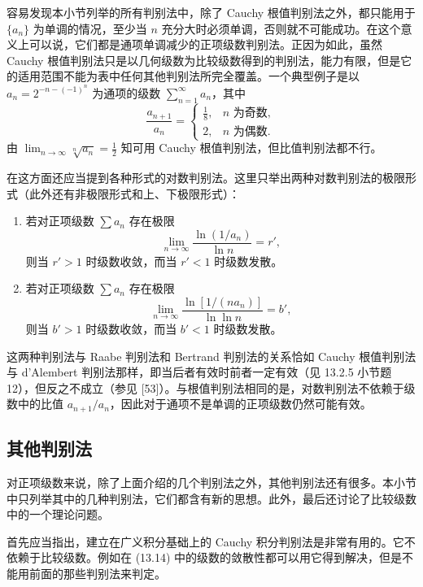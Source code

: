 \begin{xremark}
容易发现本小节列举的所有判别法中，除了 Cauchy 根值判别法之外，都只能用于 $\{a_n\}$ 为单调的情况，至少当 $n$ 充分大时必须单调，否则就不可能成功。在这个意义上可以说，它们都是通项单调减少的正项级数判别法。正因为如此，虽然 Cauchy 根值判别法只是以几何级数为比较级数得到的判别法，能力有限，但是它的适用范围不能为表中任何其他判别法所完全覆盖。一个典型例子是以 $a_n=2^{-n-(-1)^n}$ 为通项的级数 $\sum_{n=1}^{\infty}a_n$，其中
\[
\frac{a_{n+1}}{a_n}=\begin{cases}\frac18,&n\text{ 为奇数},\\2,&n\text{ 为偶数}.
\end{cases}
\]
由 $\lim_{n\to\infty}\sqrt[n]{a_n}=\frac12$ 知可用 Cauchy 根值判别法，但比值判别法都不行。
\end{xremark}

\begin{xremark}
在这方面还应当提到各种形式的对数判别法。这里只举出两种对数判别法的极限形式（此外还有非极限形式和上、下极限形式）：
\begin{enumerate}[label=\arabic*.]
\item 若对正项级数 $\sum a_n$ 存在极限
\begin{equation}
\lim_{n\to\infty}\frac{\ln(1/a_n)}{\ln n}=r',
\tag{13.15}
\end{equation}
则当 $r'>1$ 时级数收敛，而当 $r'<1$ 时级数发散。
\item 若对正项级数 $\sum a_n$ 存在极限
\begin{equation}
\lim_{n\to\infty}\frac{\ln[1/(na_n)]}{\ln\ln n}=b',
\tag{13.16}
\end{equation}
则当 $b'>1$ 时级数收敛，而当 $b'<1$ 时级数发散。
\end{enumerate}
这两种判别法与 Raabe 判别法和 Bertrand 判别法的关系恰如 Cauchy 根值判别法与 d'Alembert 判别法那样，即当后者有效时前者一定有效（见 13.2.5 小节题 12），但反之不成立（参见 [53]）。与根值判别法相同的是，对数判别法不依赖于级数中的比值 $a_{n+1}/a_n$，因此对于通项不是单调的正项级数仍然可能有效。
\end{xremark}

\subsection{其他判别法}

对正项级数来说，除了上面介绍的几个判别法之外，其他判别法还有很多。本小节中只列举其中的几种判别法，它们都含有新的思想。此外，最后还讨论了比较级数中的一个理论问题。

首先应当指出，建立在广义积分基础上的 Cauchy 积分判别法是非常有用的。它不依赖于比较级数。例如在 (13.14) 中的级数的敛散性都可以用它得到解决，但是不能用前面的那些判别法来判定。

